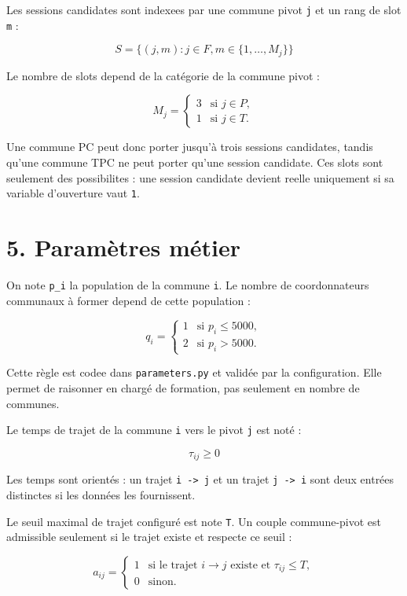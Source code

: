 \documentclass[11pt,a4paper]{article}
\begin{document}
Les sessions candidates sont indexees par une commune pivot \texttt{j} et un rang de slot \texttt{m} :

\[
S = \{(j,m) : j \in F, m \in \{1,\dots,M_j\}\}
\]

Le nombre de slots depend de la catégorie de la commune pivot :

\[
M_j =
\begin{cases}
3 & \text{si } j \in P,\\
1 & \text{si } j \in T.
\end{cases}
\]

Une commune PC peut donc porter jusqu'à trois sessions candidates, tandis qu'une commune TPC ne peut porter qu'une session candidate. Ces slots sont seulement des possibilites : une session candidate devient reelle uniquement si sa variable d'ouverture vaut \texttt{1}.

\section{5. Paramètres métier}

On note \texttt{p\_i} la population de la commune \texttt{i}. Le nombre de coordonnateurs communaux à former depend de cette population :

\[
q_i =
\begin{cases}
1 & \text{si } p_i \leq 5000,\\
2 & \text{si } p_i > 5000.
\end{cases}
\]

Cette règle est codee dans \texttt{parameters.py} et validée par la configuration. Elle permet de raisonner en chargé de formation, pas seulement en nombre de communes.

Le temps de trajet de la commune \texttt{i} vers le pivot \texttt{j} est noté :

\[
\tau_{ij} \geq 0
\]

Les temps sont orientés : un trajet \texttt{i -> j} et un trajet \texttt{j -> i} sont deux entrées distinctes si les données les fournissent.

Le seuil maximal de trajet configuré est note \texttt{T}. Un couple commune-pivot est admissible seulement si le trajet existe et respecte ce seuil :

\[
a_{ij} =
\begin{cases}
1 & \text{si le trajet } i \to j \text{ existe et } \tau_{ij} \leq T,\\
0 & \text{sinon.}
\end{cases}
\]
\end{document}
